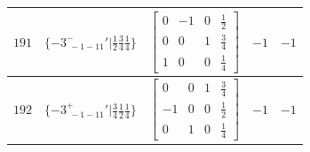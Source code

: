 \documentclass[fleqn,8pt]{jsarticle}
\begin{document}
\begin{longtable}{ccccc}
$ 191 $ & $ \{-3^{-}_{\,\,-1-11}{}'|\frac{1}{2} \frac{3}{4} \frac{1}{4}\} $ & $ \begin{bmatrix} 0 & -1 & 0 & \frac{1}{2} \\ 0 & 0 & 1 & \frac{3}{4} \\ 1 & 0 & 0 & \frac{1}{4} \end{bmatrix} $ & $ -1 $ & $ -1 $ \\ \hline
$ 192 $ & $ \{-3^{+}_{\,\,-1-11}{}'|\frac{3}{4} \frac{1}{2} \frac{1}{4}\} $ & $ \begin{bmatrix} 0 & 0 & 1 & \frac{3}{4} \\ -1 & 0 & 0 & \frac{1}{2} \\ 0 & 1 & 0 & \frac{1}{4} \end{bmatrix} $ & $ -1 $ & $ -1 $ \\
\end{longtable}
\end{document}
